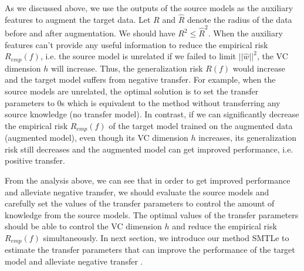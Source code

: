 As we discussed above, we use the outputs of the source models as the auxiliary features to augment the target data. Let $R$ and $\hat{R}$ denote the radius of the data before and after augmentation. We should have $R^2 \le \hat{R}^2$. When the auxiliary features can't provide any useful information to reduce the empirical risk $R_{emp}(f)$, i.e. the source model is unrelated if we failed to limit $||\hat{w}||^2$, the VC dimension $h$ will increase. Thus, the generalization risk $R(f)$ would increase and the target model suffers from negative transfer. For example, when the source models are unrelated, the optimal solution is to set the transfer parameters to 0s which is equivalent to the method without transferring any source knowledge (no transfer model). In contrast, if we can significantly decrease the empirical risk $R_{emp}(f)$ of the target model trained on the augmented data (augmented model), even though its VC dimension $h$ increases, its generalization risk still decreases and the augmented model can get improved performance, i.e. positive transfer.

From the analysis above, we can see that in order to get improved performance and alleviate negative transfer, we should evaluate the source models and carefully set the values of the transfer parameters to control the amount of knowledge from the source models. The optimal values of the transfer parameters should be able to control the VC dimension $h$ and reduce the empirical risk $R_{emp}(f)$ simultaneously.
In next section, we introduce our method SMTLe to estimate the transfer parameters that can improve the performance of the target model and alleviate negative transfer .

